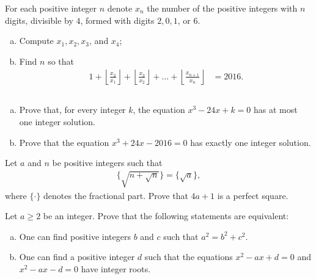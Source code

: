 \documentclass[problems.tex]{subfile}
\begin{document}
	
	
	\begin{problem}
		For each positive integer $n$ denote $x_n$ the number of the positive
		integers with $n$ digits, divisible by $4$, formed with digits $2, 0, 1$, or $6$.
		\begin{enumerate}[(a)]
			\item Compute $x_1, x_2, x_3$, and $x_4$;
			\item Find $n$ so that
			\begin{align*}
				1 + \left\lfloor \frac{x_2}{x_1}\right\rfloor + \left\lfloor \frac{x_3}{x_2}\right\rfloor + \dots + \left\lfloor \frac{x_{n+1}}{x_n}\right\rfloor &= 2016.
			\end{align*}
		\end{enumerate}
	\end{problem}
	
	
	
	
	\begin{problem}
		$ $
		\begin{enumerate}[(a)]
			\item Prove that, for every integer $k$, the equation $x^3 - 24x + k = 0$ has at most one integer solution.
			\item Prove that the equation $x^3 + 24x - 2016 = 0$ has exactly one integer solution.
		\end{enumerate}
	\end{problem}
	
	
	
	\begin{problem}
		Let $a$ and $n$ be positive integers such that
		\begin{align*}
			\Bigg\{ \sqrt{n + \sqrt{n}}\Bigg\} = \big\{\sqrt a\big\},
		\end{align*}
		where $\{ \cdot \}$ denotes the fractional part. Prove that $4a+1$ is a perfect square.
	\end{problem}
	
	
	
	\begin{problem}
		Let $a \geq 2$ be an integer. Prove that the following statements are equivalent:
		\begin{enumerate}[(a)]
			\item One can find positive integers $b$ and $c$ such that $a^2 = b^2 + c^2$.
			\item One can find a positive integer $d$ such that the equations $x^2 - ax + d = 0$ and $x^2 - ax - d = 0$ have integer roots.
		\end{enumerate}
	\end{problem}
	
\end{document}
